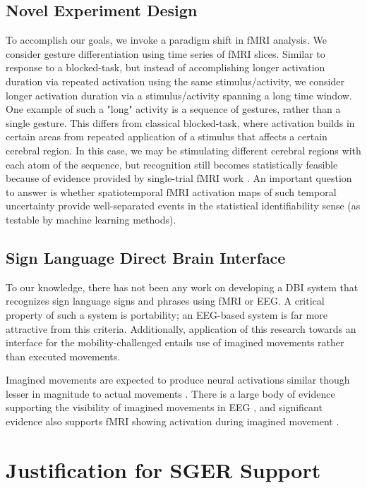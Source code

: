 \documentclass{proposal}
\begin{document}
\subsection{Novel Experiment Design}

To accomplish our goals, we invoke a paradigm shift in fMRI analysis. We consider gesture differentiation using time series of fMRI slices. Similar to response to a blocked-task, but instead of accomplishing longer activation duration via repeated activation using the same stimulus/activity, we consider longer activation duration via a stimulus/activity spanning a long time window. One example of such a "long" activity is a sequence of gestures, rather than a single gesture. This differs from classical blocked-task, where activation builds in certain areas from repeated application of a stimulus that affects a certain cerebral region. In this case, we may be stimulating different cerebral regions with each atom of the sequence, but recognition still becomes statistically feasible because of evidence provided by single-trial fMRI work \cite[]{buckner1996dca}. An important question to answer is whether spatiotemporal fMRI activation maps of such temporal uncertainty provide well-separated events in the statistical identifiability sense (as testable by machine learning methods).

\subsection{Sign Language Direct Brain Interface}

To our knowledge, there has not been any work on developing a DBI system that recognizes sign language signs and phrases using fMRI or EEG. A critical property of such a system is portability; an EEG-based system is far more attractive from this criteria. Additionally, application of this research towards an interface for the mobility-challenged entails use of imagined movements rather than executed movements.


Imagined movements are expected to produce neural activations similar though lesser in magnitude to actual movements \cite[]{beisteiner1995mrm}. There is a large body of evidence supporting the visibility of imagined movements in EEG \cite[]{pfurtscheller1997mia, beisteiner1995mrm, lang1996eam}, and significant evidence also supports fMRI showing activation during imagined movement \cite[]{lotze1999aac}.

\section{Justification for SGER Support}
\end{document}
